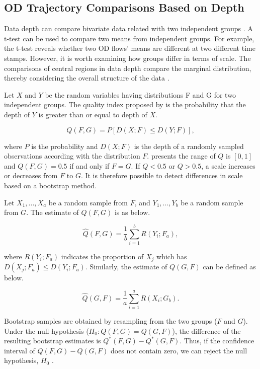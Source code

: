\documentclass[a4paper,UKenglish]{lipics-v2016}
\begin{document}
\subsection{OD Trajectory Comparisons Based on Depth}
Data depth can compare bivariate data related with two independent groups \cite{liu93JASA}. A t-test can be used to compare two means from independent groups. For example, the t-test reveals whether two OD flows' means  are different at two different time stamps. However, it is worth examining how groups differ in terms of scale. The comparisons of central regions in data depth compare the marginal distribution, thereby considering the overall structure of the data \cite{wilcox03MBR}.

Let $X$ and $Y$ be the random variables having distributions F and G for two independent groups. The quality index proposed by \cite{liu93JASA} is the probability that the depth of $Y$ is greater than or equal to depth of $X$. 

\begin{equation*}
Q(F,G) = P[D(X;F) \leq D(Y;F)],
\end{equation*}

where $P$ is the probability and $D(X;F)$ is the depth of a randomly sampled observations according with the distribution $F$. \cite{liu93JASA} presents the range of $Q$ is $[0,1]$ and $Q(F,G) = 0.5$ if and only if $F = G$. If $Q < 0.5$  or $Q > 0.5$, a scale increases or decreases from  $F$ to $G$.   It is therefore possible to detect differences in scale based on a bootstrap method.

Let $X_1,...,X_a$ be a random sample from $F$, and $Y_1,...,Y_b$ be a random sample from $G$. The estimate of $Q(F,G)$ is as below.

\begin{equation*}
\hat{Q}(F,G) =\frac{1}{b} \sum_{i=1}^{b} R(Y_i;F_a),
\end{equation*}

where $R(Y_i;F_a)$ indicates the proportion of $X_j$ which has $D(X_j;F_a) \leq D(Y_i;F_a)$. Similarly, the estimate of $Q(G,F)$ can be defined as below.

\begin{equation*}
\hat{Q}(G,F) =\frac{1}{a} \sum_{i=1}^{a} R(X_i;G_b).
\end{equation*}

Bootstrap samples are obtained by resampling from the two groups ($F$ and $G$). Under the null hypothesis ($H_0: Q(F,G) = Q(G,F)$), the difference of the resulting bootstrap estimates is $Q^*(F,G) - Q^*(G,F)$. Thus, if the confidence interval of $Q(F,G) - Q(G,F)$ does not contain zero, we can reject the null hypothesis, $H_0$ \cite{liu93JASA,wilcox03MBR}.
\end{document}
